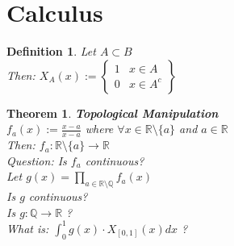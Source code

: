 \documentclass[12pt]{extarticle}
\theoremstyle{plain}
\newtheorem{thm}{Theorem}[section]
\theoremstyle{plain}
\theoremstyle{plain}
\theoremstyle{Definition}
\newtheorem{def.}{Definition}[section]
\theoremstyle{Definition}
\theoremstyle{plain}
\theoremstyle{plain}
\newcommand{\cut}[0]{\noindent\framebox[\linewidth]{\rule{\linewidth}{2pt}}\\}
\begin{document}
\section{Calculus}
\begin{def.}
	Let $A \subset B$ \\ 
	Then: $X_A(x) := \begin{Bmatrix}
	1 & x \in A \\ 
	0 & x \in A^c 
	\end{Bmatrix}$
\end{def.}
\begin{thm} \textbf{Topological Manipulation} \\
	$f_a(x) := \frac{x - a}{x - a}$ where $\forall x \in \mathbb{R} \setminus \{a\}$ and $a \in \mathbb{R}$ \\ 
	Then: $f_a : \mathbb{R} \setminus \{a\} \to \mathbb{R}$ \\ 
	Question: Is $f_a$ continuous? \\ 
	Let $g(x) = \prod_{a \in \mathbb{R} \setminus \mathbb{Q} } f_a(x)$ \\ 
	Is $g$ continuous? \\
	Is $g : \mathbb{Q} \to \mathbb{R}$ ? \\
	What is: $\int_{0}^1 g(x) \cdot X_{[0,1]}(x) dx$ ?
\end{thm}
\cut 
\end{document}
